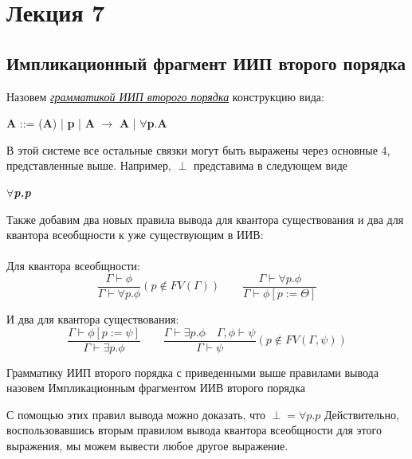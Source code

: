 \section{Лекция 7}
	\subsection{Импликационный фрагмент ИИП второго порядка}
 	\begin{center}
 		\begin{definition}
 			Назовем \textit{\underline{грамматикой ИИП второго порядка}} конструкцию вида: 
 		\end{definition}
 	\textbf{A} ::= 
 	(\textbf{A}) |
 	\textbf{p} |
 	\textbf{A} $\rightarrow$ \textbf{A} |
 	$\forall$\textbf{p}.\textbf{A} 
 	
 	\end{center}
 
 	В этой системе все остальные связки могут быть выражены через основные 4, представленные выше. Например, $\perp$ представима в следующем виде
 	\begin{center}
 		{\textbf{\textsl\textit{$\forall$p.p}}} \\
 	\end{center}
 	
 	
 	 Также добавим два новых правила вывода для квантора существования и два для квантора всеобщности к уже существующим в ИИВ: \\ \\
 	
	Для квантора всеобщности: \\ 
 	
    \[ \dfrac{\Gamma\vdash\phi}{\Gamma\vdash\forall p.\phi} (p\notin FV(\Gamma)) \qquad
        \dfrac{\Gamma\vdash\forall p.\phi}{\Gamma\vdash\phi[p:=\Theta]} \]
 	
 	 И два для квантора существования: \\
 	
    \[ \dfrac{\Gamma\vdash\phi[p:= \psi]}{\Gamma\vdash\exists p.\phi}\qquad
        \dfrac{\Gamma\vdash\exists p.\phi\quad\Gamma, \phi\vdash\psi}{\Gamma\vdash\psi} (p\notin FV(\Gamma, \psi)) \]
 	
 	
 	\begin{definition}
 		Грамматику ИИП второго порядка с приведенными выше правилами вывода назовем Импликационным фрагментом ИИВ второго порядка\\ 
 	\end{definition}
	{С помощью этих правил вывода можно доказать, что \textbf{${\perp = \forall p.p}$}
		Действительно, воспользовавшись вторым правилом вывода квантора всеобщности для этого выражения, мы можем вывести любое другое выражение.}
 	
